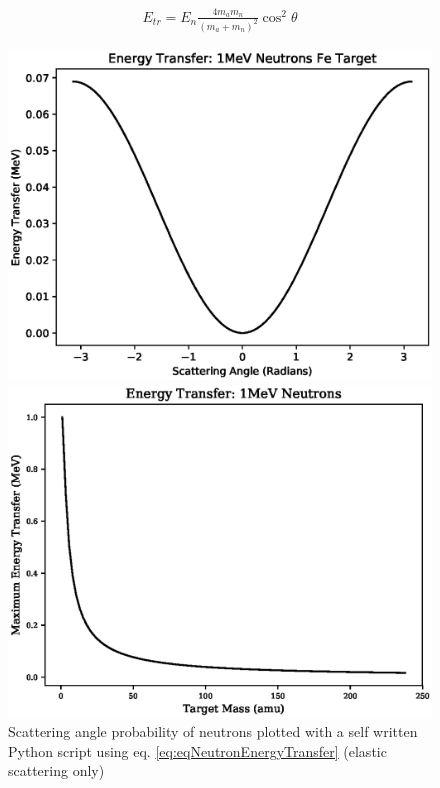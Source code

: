 \begin{equation}
\begin{split}
E_{tr} = E_{n} \frac{4 m_a m_n}{(m_a + m_n)^2} \cos^2{\theta}
\end{split}
\label{eq:eqNeutronEnergyTransfer}
\end{equation}

\begin{figure}
\centering
\begin{minipage}{.49\textwidth}
\centering
\includegraphics[width=.97\linewidth]{chapters/austenitic_steels_in_nuclear/plots/scattering_angle.eps}
\caption{Scattering angle probability of neutrons plotted with a self written Python script using eq. \ref{eq:eqNeutronEnergyTransfer}\cite{dosimetrygreening}\cite{duderstadthamilton} (elastic scattering only)}
\label{fig:scatteringangle}
\end{minipage}
\begin{minipage}{.01\textwidth}
\end{minipage}
\begin{minipage}{.49\textwidth}
\centering
\includegraphics[width=.97\linewidth]{chapters/austenitic_steels_in_nuclear/plots/nuclei_mass.eps}

\end{minipage}
\end{figure}
